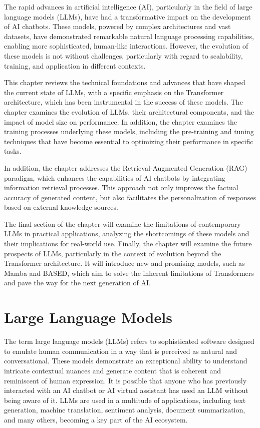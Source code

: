 The rapid advances in artificial intelligence (AI), particularly in the field of large language models (LLMs), have had a transformative impact on the development of AI chatbots. These models, powered by complex architectures and vast datasets, have demonstrated remarkable natural language processing capabilities, enabling more sophisticated, human-like interactions. However, the evolution of these models is not without challenges, particularly with regard to scalability, training, and application in different contexts.

This chapter reviews the technical foundations and advances that have shaped the current state of LLMs, with a specific emphasis on the Transformer architecture, which has been instrumental in the success of these models. The chapter examines the evolution of LLMs, their architectural components, and the impact of model size on performance. In addition, the chapter examines the training processes underlying these models, including the pre-training and tuning techniques that have become essential to optimizing their performance in specific tasks.

In addition, the chapter addresses the Retrieval-Augmented Generation (RAG) paradigm, which enhances the capabilities of AI chatbots by integrating information retrieval processes. This approach not only improves the factual accuracy of generated content, but also facilitates the personalization of responses based on external knowledge sources.

The final section of the chapter will examine the limitations of contemporary LLMs in practical applications, analyzing the shortcomings of these models and their implications for real-world use. Finally, the chapter will examine the future prospects of LLMs, particularly in the context of evolution beyond the Transformer architecture. It will introduce new and promising models, such as Mamba and BASED, which aim to solve the inherent limitations of Transformers and pave the way for the next generation of AI.

\section{Large Language Models}

The term large language models (LLMs) refers to sophisticated software designed to emulate human communication in a way that is perceived as natural and conversational. These models demonstrate an exceptional ability to understand intricate contextual nuances and generate content that is coherent and reminiscent of human expression. It is possible that anyone who has previously interacted with an AI chatbot or AI virtual assistant has used an LLM without being aware of it. LLMs are used in a multitude of applications, including text generation, machine translation, sentiment analysis, document summarization, and many others, becoming a key part of the AI ecosystem.


